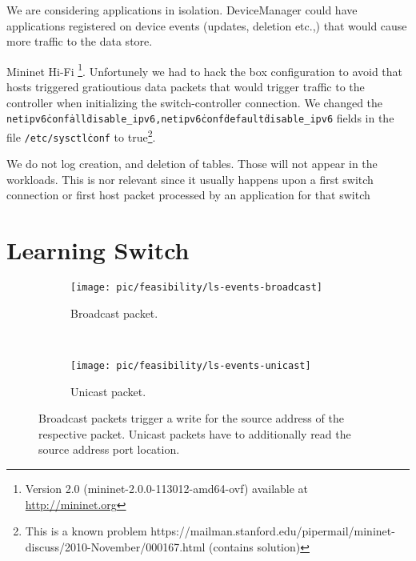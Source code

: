 \label{sec:feasibility:apps}
\glsresetall

We are considering applications in isolation. DeviceManager could have
applications registered on device events (updates, deletion etc.,)
that would cause more traffic to the data store. 
 


Mininet  Hi-Fi \cite{Handigol:2012tg}\footnote{Version 2.0 (mininet-2.0.0-113012-amd64-ovf) available at \url{http://mininet.org}}. Unfortunely we had to hack the box configuration to avoid that hosts  triggered gratioutious data packets that would  trigger traffic to the controller when initializing the switch-controller connection. We changed the \texttt{net\.ipv6\.conf\.all\.disable\_ipv6,net\.ipv6\.conf\.default\.disable\_ipv6} fields in the file \texttt{/etc/sysctl\.conf} to true\footnote{This is a known problem https://mailman.stanford.edu/pipermail/mininet-discuss/2010-November/000167.html (contains solution)}. 

We do not log creation, and deletion of tables. Those will not appear in the workloads. This is nor relevant since it usually happens upon a first switch connection or first host packet processed by an application  for that switch


\section{Learning Switch}
\label{sec:feasibility:ls}
\glsresetall

\begin{figure}[ht]

  \begin{subfigure}[b]{0.5\textwidth}
                \centering
                \texttt{[image: pic/feasibility/ls-events-broadcast]}
                \caption{Broadcast packet.}
                \label{fig:ls:interaction:broadcast}
        \end{subfigure}%
        ~
        \begin{subfigure}[b]{0.5\textwidth}
                \centering
                \texttt{[image: pic/feasibility/ls-events-unicast]}
                \caption{Unicast packet.}
                \label{fig:ls:interaction:unicast}
        \end{subfigure}
        \caption[Learning Switch workloads]{Broadcast packets trigger a write for the source address of the respective packet. Unicast packets have to additionally read the source address port location.}
        \label{fig:ls:interaction}
\end{figure}

